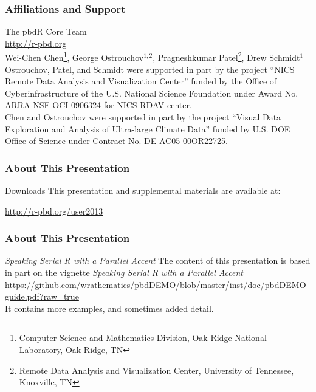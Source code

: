 \frame{
  \maketitle
}

\begin{frame}[noframenumbering]
\frametitle{Affiliations and Support}
{\small
The pbdR Core Team\\ \url{http://r-pbd.org}
\\[.4cm]
Wei-Chen Chen\footnote{\tiny{Computer Science and Mathematics Division, Oak Ridge National Laboratory, Oak Ridge, TN}}, 
George Ostrouchov$^{1,2}$, 
Pragneshkumar Patel\footnote{\tiny{Remote Data Analysis and Visualization Center, University of Tennessee, Knoxville, TN}}, 
Drew Schmidt$^1$
\\[.4cm]
Ostrouchov, Patel, and Schmidt were supported in part by the project
``NICS Remote Data Analysis and Visualization Center''
funded by the Office of Cyberinfrastructure of the
U.S. National Science Foundation
under Award No. ARRA-NSF-OCI-0906324 for NICS-RDAV center.\\[.4cm]
Chen and Ostrouchov were supported in part by the project
``Visual Data Exploration and Analysis of Ultra-large Climate Data''
funded by U.S. DOE Office of Science
under Contract No. DE-AC05-00OR22725.\\
}
\end{frame}

\begin{frame}
\frametitle{About This Presentation}
 \begin{block}{Downloads}
  This presentation and supplemental materials are available at:
  \begin{center}
  \url{http://r-pbd.org/user2013}
  \end{center}
 \end{block}
\end{frame}


\begin{frame}
\frametitle{About This Presentation}
 \begin{block}{\emph{Speaking Serial R with a Parallel Accent}}
  The content of this presentation is based in part on the  
vignette \emph{Speaking Serial R with a Parallel Accent}\\[.4cm]
  \url{https://github.com/wrathematics/pbdDEMO/blob/master/inst/doc/pbdDEMO-guide.pdf?raw=true}\\[.4cm]
  It contains more examples, and sometimes added detail.
 \end{block}
\end{frame}


